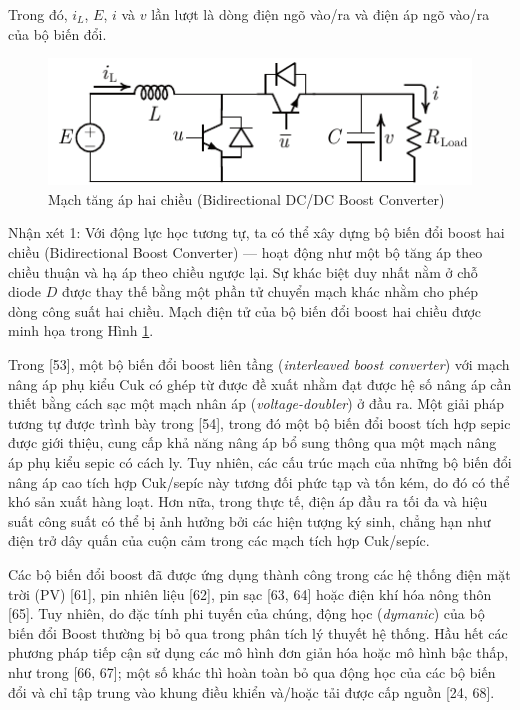 \noindent Trong đó, $i_L$, $E$, $i$ và $v$ lần lượt là dòng điện ngõ vào/ra và điện áp ngõ vào/ra của bộ biến đổi. \par
\begin{figure}
    \centering
    \includegraphics[width= 0.7 \textwidth]{Figures/Content_Pages/Chapter_2/C2_3.pdf}
    \caption{Mạch tăng áp hai chiều (Bidirectional DC/DC Boost Converter)}
    \label{fig:C2_3}
\end{figure}
Nhận xét 1: Với động lực học tương tự, ta có thể xây dựng bộ biến đổi boost hai chiều (Bidirectional Boost Converter) — hoạt động như một bộ tăng áp theo chiều thuận và hạ áp theo chiều ngược lại. Sự khác biệt duy nhất nằm ở chỗ diode \(D\) được thay thế bằng một phần tử chuyển mạch khác nhằm cho phép dòng công suất hai chiều. Mạch điện tử của bộ biến đổi boost hai chiều được minh họa trong Hình \ref{fig:C2_3}.\par
Trong [53], một bộ biến đổi boost liên tầng (\textit{interleaved boost converter}) với mạch nâng áp phụ kiểu Cuk có ghép từ được đề xuất nhằm đạt được hệ số nâng áp cần thiết bằng cách sạc một mạch nhân áp (\textit{voltage-doubler}) ở đầu ra. Một giải pháp tương tự được trình bày trong [54], trong đó một bộ biến đổi boost tích hợp sepic được giới thiệu, cung cấp khả năng nâng áp bổ sung thông qua một mạch nâng áp phụ kiểu sepic có cách ly. Tuy nhiên, các cấu trúc mạch của những bộ biến đổi nâng áp cao tích hợp Cuk/sepíc này tương đối phức tạp và tốn kém, do đó có thể khó sản xuất hàng loạt. Hơn nữa, trong thực tế, điện áp đầu ra tối đa và hiệu suất công suất có thể bị ảnh hưởng bởi các hiện tượng ký sinh, chẳng hạn như điện trở dây quấn của cuộn cảm trong các mạch tích hợp Cuk/sepíc. \par
Các bộ biến đổi boost đã được ứng dụng thành công trong các hệ thống điện mặt trời (PV) [61], pin nhiên liệu [62], pin sạc [63, 64] hoặc điện khí hóa nông thôn [65]. Tuy nhiên, do đặc tính phi tuyến của chúng, động học (\textit{dymanic}) của bộ biến đổi Boost thường bị bỏ qua trong phân tích lý thuyết hệ thống. Hầu hết các phương pháp tiếp cận sử dụng các mô hình đơn giản hóa hoặc mô hình bậc thấp, như trong [66, 67]; một số khác thì hoàn toàn bỏ qua động học của các bộ biến đổi và chỉ tập trung vào khung điều khiển và/hoặc tải được cấp nguồn [24, 68].\par
